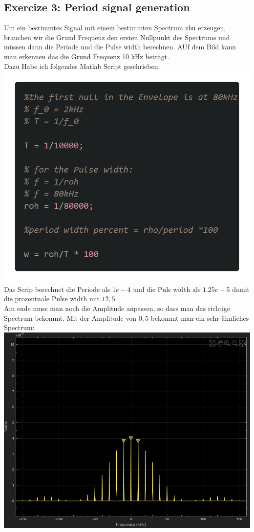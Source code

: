 \documentclass{scrartcl}
\begin{document}
\subsection*{Exercize 3: Period signal generation}

Um ein bestimmtes Signal mit einem bestimmten Spectrum zhu erzeugen, brauchen wir die Grund Frequenz den ersten Nullpunkt des Spectrums und müssen dann die Periode und die Pulse width berechnen. AUf dem Bild kann man erkennen das die Grund Frequenz 10 kHz beträgt.\\
Dazu Habe ich folgendes Matlab Script geschrieben:\\
\includegraphics[scale=0.3]{codem3.png}\\
Das Scrip berechnet die Periode als $1e-4$ und die Puls width als $1.25e-5$ damit die prozentuale Pulse width mit $12,5$.\\
Am ende muss man noch die Amplitude anpassen, so dass man das richtige Spectrum bekommt. Mit der Amplitude von $0,5$ bekommt man ein sehr ähnliches Spectrum:\\
\includegraphics[scale=0.6]{PulseScopeE3.png}
\end{document}
